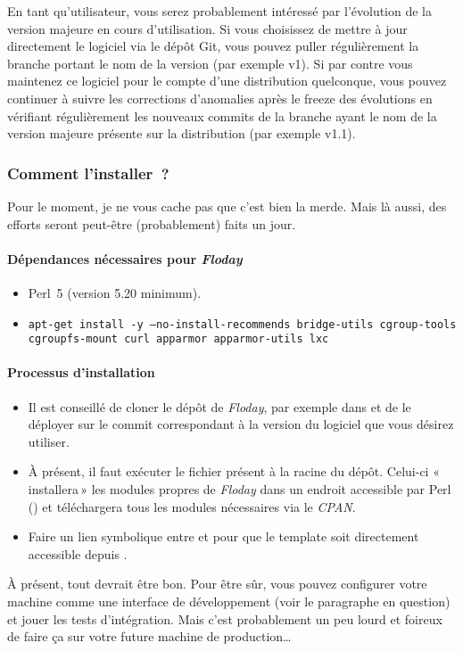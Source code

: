 En tant qu'utilisateur, vous serez probablement intéressé par l'évolution de la version majeure en cours d'utilisation. Si vous choisissez de mettre à jour directement le logiciel via le dépôt Git, vous pouvez puller régulièrement la branche portant le nom de la version (par exemple v1).
Si par contre vous maintenez ce logiciel pour le compte d'une distribution quelconque, vous pouvez continuer à suivre les corrections d'anomalies après le freeze des évolutions en vérifiant régulièrement les nouveaux commits de la branche ayant le nom de la version majeure présente sur la distribution (par exemple v1.1).

\subsubsection{Comment l'installer~?}

Pour le moment, je ne vous cache pas que c'est bien la merde.
Mais là aussi, des efforts seront peut-être (probablement) faits un jour.

\paragraph{Dépendances nécessaires pour \emph{Floday}}
\begin{itemize}
	\item Perl~5 (version 5.20 minimum).
	\item \texttt{apt-get install -y --no-install-recommends bridge-utils cgroup-tools\\cgroupfs-mount curl apparmor apparmor-utils lxc}
\end{itemize}

\paragraph{Processus d'installation}

\begin{itemize}
	\item Il est conseillé de cloner le dépôt de \emph{Floday}, par exemple dans  et de le déployer sur le commit correspondant à la version du logiciel que vous désirez utiliser.
	\item À présent, il faut exécuter le fichier  présent à la racine du dépôt.
		Celui-ci «\,installera\,» les modules propres de \emph{Floday} dans un endroit accessible par Perl () et téléchargera tous les modules nécessaires via le \emph{CPAN}.
	\item Faire un lien symbolique entre  et  pour que le template soit directement accessible depuis .
\end{itemize}

À présent, tout devrait être bon. Pour être sûr, vous pouvez configurer votre machine comme une interface de développement (voir le paragraphe en question) et jouer les tests d'intégration.
Mais c'est probablement un peu lourd et foireux de faire ça sur votre future machine de production\dots
